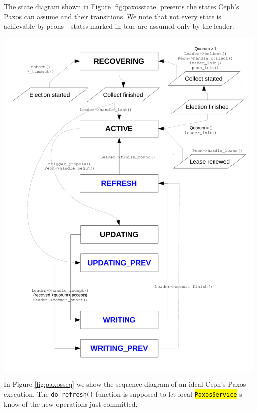 \documentclass{article}
\newcommand{\hlc}[2][yellow]{\sethlcolor{#1}\hl{#2}}
\renewcommand{\c}[1]{\xspace{\small\hlc[light-gray]{\texttt{#1}}}\xspace}
\begin{document}
The state diagram shown in Figure \ref{fig:paxosstate} presents the states Ceph's Paxos can assume 
and their transitions.
We note that not every state is achievable by peons - states marked in blue are assumed only by the leader.

\begin{center}
	\includegraphics[scale=0.50]{figs/paxos_dia.pdf}
	\label{fig:paxosstate}
\end{center}

In Figure \ref{fig:paxosseq} we show the sequence diagram of an ideal Ceph's Paxos execution.
The \texttt{do\_refresh()} function is supposed to let local \c{PaxosService}s
know of the new operations just committed.
\end{document}

